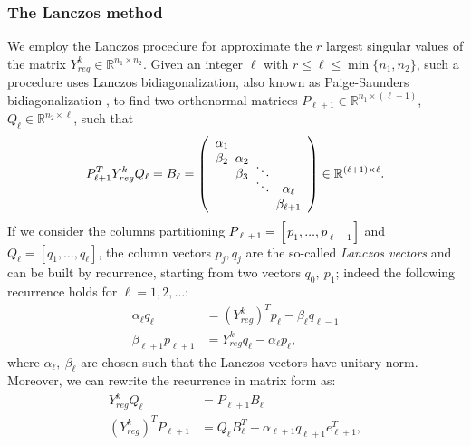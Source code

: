 \documentclass[pdflatex,sn-mathphys-num]{sn-jnl}
\numberwithin{equation}{section}%
\def\R{\mathbb{R}}
\newcommand{\Yck}{{Y_{reg}^k}}
\newcommand{\REV}[1]{\textcolor{black}{#1}}
\theoremstyle{thmstyleone}%
\theoremstyle{thmstyletwo}%
\theoremstyle{thmstylethree}%
\begin{document}
\subsubsection{The Lanczos method}
We employ the Lanczos procedure for approximate the $r$ largest singular values of the matrix $\Yck\in\R^{n_1\times n_2}$. Given an integer $\ell$ with $r \le \ell \le \min\{n_1, n_2\}$, such a procedure uses Lanczos bidiagonalization, also known as Paige-Saunders bidiagonalization \cite{paige1982lsqr}, to find two orthonormal matrices $P_{\ell+1} \in \R^{n_1 \times (\ell +1)}$, $Q_\ell \in \R^{n_2 \times \ell}$, such that
\[
    P_{\ell+1}^T \Yck Q_\ell = B_\ell = 
    \left(
    \begin{array}{c@{\hspace{.5em}}c@{\hspace{.5em}}c@{\hspace{.5em}}c}
        \alpha_1 &           &        &  \\
        \beta_2  & \alpha_2  &        &  \\
                 & \beta_3   & \smash{\ddots} &  \\
                 &           & \smash{\ddots} & \alpha_\ell \\
                 &           &        & \beta_{\ell+1}
    \end{array}
    \right) \in \R^{(\ell+1) \times \ell}.
\]
If we consider the columns partitioning \REV{$P_{\ell+1} = [p_1, \dots, p_{\ell + 1}]$} and $Q_\ell = [q_1, \dots, q_{\ell}]$, the column vectors $p_j, q_j$ are the so-called \textit{Lanczos vectors} and  can be built by recurrence, starting from two vectors $q_0, \ p_1$;
indeed the following recurrence holds for $\ell = 1, 2,\dots$:
\begin{align}
    \alpha_\ell q_\ell &=(\Yck)^T p_\ell - \beta_\ell q_{\ell-1} \label{eq:Lanczos_recurrence_vector_1} \\
    \beta_{\ell+1} p_{\ell+1} &= \Yck q_\ell - \alpha_\ell p_\ell, \label{eq:Lanczos_recurrence_vector_2}
\end{align}
where $\alpha_\ell, \ \beta_\ell$ are chosen such that the Lanczos vectors have unitary norm. Moreover, we can rewrite the recurrence in matrix form as:
\begin{align}
    \Yck Q_\ell &= P_{\ell + 1} B_\ell \label{eq:Lanczos_recurrence_matrix_1} \\
    (\Yck)^T P_{\ell +1} &= Q_\ell B_\ell^T + \alpha_{\ell+1}q_{\ell+1}e_{\ell+1}^T, \label{eq:Lanczos_recurrence_matrix_2}
\end{align}
\end{document}
